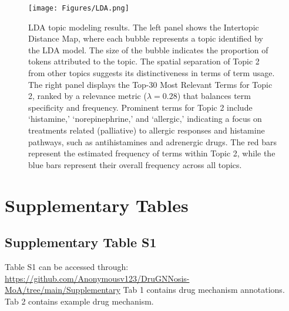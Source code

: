 \documentclass[journal,twoside,web]{ieeecolor}
\begin{document}
\begin{figure}[h!]
    \centering
    \texttt{[image: Figures/LDA.png]}
    \caption{LDA topic modeling results.
    The left panel shows the Intertopic Distance Map, where each bubble represents a topic identified by the LDA model. 
    The size of the bubble indicates the proportion of tokens attributed to the topic. 
    The spatial separation of Topic 2 from other topics suggests its distinctiveness in terms of term usage. 
    The right panel displays the Top-30 Most Relevant Terms for Topic 2, ranked by a relevance metric ($\lambda = 0.28$) that balances term specificity and frequency. Prominent terms for Topic 2 include `histamine,' `norepinephrine,' and `allergic,' indicating a focus on treatments related (palliative) to allergic responses and histamine pathways, such as antihistamines and adrenergic drugs. 
    The red bars represent the estimated frequency of terms within Topic 2, while the blue bars represent their overall frequency across all topics.}
    \label{fig:LDA}
\end{figure}


\newpage

\clearpage

\section{Supplementary Tables}
\label{sec11}

\subsection{Supplementary Table S1} 
Table S1 can be accessed through: 
\url{https://github.com/Anonymousv123/DruGNNosis-MoA/tree/main/Supplementary}
Tab 1 contains drug mechanism annotations.
Tab 2 contains example drug mechanism.
\end{document}
